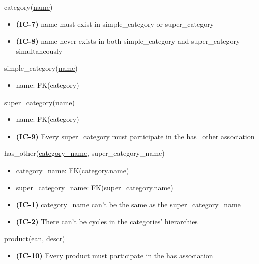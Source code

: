 \documentclass[12pt,a4paper]{article}
\begin{document}
  \vspace*{10pt}

  \noindent
  category(\underline{name})
  \begin{itemize}[nosep]
    \item \textsf{\textbf{(IC-7)}} name \textsf{must exist in} simple\_category \textsf{or} super\_category
    \item \textsf{\textbf{(IC-8)}} name \textsf{never exists in both} simple\_category \textsf{and} super\_category \textsf{simultaneously}
  \end{itemize}

  \vspace*{10pt}

  \noindent
  simple\_category(\underline{name})
  \begin{itemize}[nosep]
    \item name: FK(category)
  \end{itemize}

  \vspace*{10pt}

  \noindent
  super\_category(\underline{name})
  \begin{itemize}[nosep]
    \item name: FK(category)
    \item \textsf{\textbf{(IC-9)} Every} super\_category \textsf{must participate in the} has\_other \textsf{association}
  \end{itemize}

  \vspace*{10pt}

  \noindent
  has\_other(\underline{category\_name}, super\_category\_name)
  \begin{itemize}[nosep]
    \item category\_name: FK(category.name)
    \item super\_category\_name: FK(super\_category.name)
    \item \textsf{\textbf{(IC-1)}} category\_name \textsf{can't be the same as the} super\_category\_name
    \item \textsf{\textbf{(IC-2)} There can't be cycles in the categories' hierarchies}
  \end{itemize}

  \vspace*{10pt}

  \noindent
  product(\underline{ean}, descr)
  \begin{itemize}[nosep]
    \item \textsf{\textbf{(IC-10)} Every} product \textsf{must participate in the} has \textsf{association}
  \end{itemize}
\end{document}
